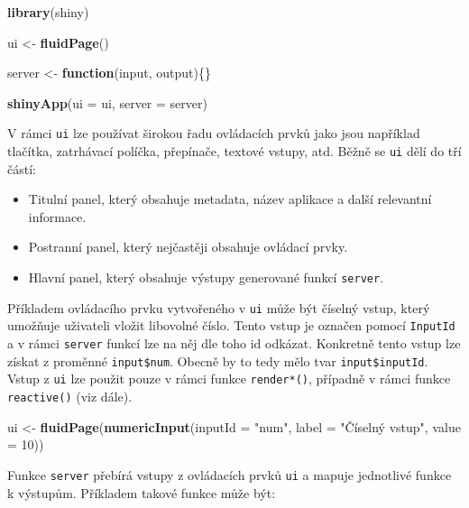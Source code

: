 \documentclass[12pt,]{article}
\newenvironment{Shaded}{\begin{snugshade}}{\end{snugshade}}
\newcommand{\KeywordTok}[1]{\textcolor[rgb]{0.13,0.29,0.53}{\textbf{#1}}}
\newcommand{\DataTypeTok}[1]{\textcolor[rgb]{0.13,0.29,0.53}{#1}}
\newcommand{\DecValTok}[1]{\textcolor[rgb]{0.00,0.00,0.81}{#1}}
\newcommand{\StringTok}[1]{\textcolor[rgb]{0.31,0.60,0.02}{#1}}
\newcommand{\ControlFlowTok}[1]{\textcolor[rgb]{0.13,0.29,0.53}{\textbf{#1}}}
\newcommand{\NormalTok}[1]{#1}
\providecommand{\tightlist}{%
  \setlength{\itemsep}{0pt}\setlength{\parskip}{0pt}}
\begin{document}
\begin{Shaded}
\begin{Highlighting}[]
\KeywordTok{library}\NormalTok{(shiny)}

\NormalTok{ui <-}\StringTok{ }\KeywordTok{fluidPage}\NormalTok{()}

\NormalTok{server <-}\StringTok{ }\ControlFlowTok{function}\NormalTok{(input, output)\{\}}

\KeywordTok{shinyApp}\NormalTok{(}\DataTypeTok{ui =}\NormalTok{ ui, }\DataTypeTok{server =}\NormalTok{ server)}
\end{Highlighting}
\end{Shaded}

V rámci \texttt{ui} lze používat širokou řadu ovládacích prvků jako jsou
například tlačítka, zatrhávací políčka, přepínače, textové vstupy, atd.
Běžně se \texttt{ui} dělí do tří částí:

\begin{itemize}
\tightlist
\item
  Titulní panel, který obsahuje metadata, název aplikace a další
  relevantní informace.
\item
  Postranní panel, který nejčastěji obsahuje ovládací prvky.
\item
  Hlavní panel, který obsahuje výstupy generované funkcí
  \texttt{server}.
\end{itemize}

Příkladem ovládacího prvku vytvořeného v \texttt{ui} může být číselný
vstup, který umožňuje uživateli vložit libovolné číslo. Tento vstup je
označen pomocí \texttt{InputId} a v rámci \texttt{server} funkcí lze na
něj dle toho id odkázat. Konkretně tento vstup lze získat z proměnné
\texttt{input\$num}. Obecně by to tedy mělo tvar
\texttt{input\$inputId}. Vstup z \texttt{ui} lze použit pouze v rámci
funkce \texttt{render*()}, případně v rámci funkce \texttt{reactive()}
(viz dále).

\begin{Shaded}
\begin{Highlighting}[]
\NormalTok{ui <-}\StringTok{ }\KeywordTok{fluidPage}\NormalTok{(}\KeywordTok{numericInput}\NormalTok{(}\DataTypeTok{inputId =} \StringTok{"num"}\NormalTok{,}
                             \DataTypeTok{label =} \StringTok{"Číselný vstup"}\NormalTok{,}
                             \DataTypeTok{value =} \DecValTok{10}\NormalTok{))}
\end{Highlighting}
\end{Shaded}

Funkce \texttt{server} přebírá vstupy z ovládacích prvků \texttt{ui} a
mapuje jednotlivé funkce k výstupům. Příkladem takové funkce může být:
\end{document}
